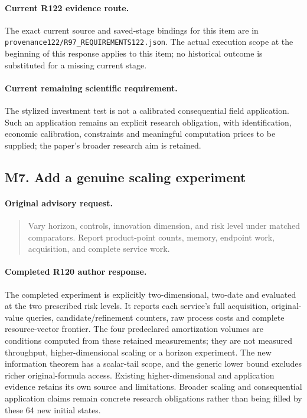 \paragraph{Current R122 evidence route.}
The exact current source and saved-stage bindings for this item are in \nolinkurl{provenance122/R97_REQUIREMENTS122.json}. The actual execution scope at the beginning of this response applies to this item; no historical outcome is substituted for a missing current stage.
\paragraph{Current remaining scientific requirement.}
The stylized investment test is not a calibrated consequential field application. Such an application remains an explicit research obligation, with identification, economic calibration, constraints and meaningful computation prices to be supplied; the paper's broader research aim is retained.

\subsection{M7. Add a genuine scaling experiment}
\label{response122:M7}

\paragraph{Original advisory request.}
\begin{quote}
Vary horizon, controls, innovation dimension, and risk level under matched comparators. Report product-point counts, memory, endpoint work, acquisition, and complete service work.
\end{quote}

\paragraph{Completed R120 author response.}
The completed experiment is explicitly two-dimensional, two-date and evaluated at the two prescribed risk levels. It reports each service's full acquisition, original-value queries, candidate/refinement counters, raw process costs and complete resource-vector frontier. The four predeclared amortization volumes are conditions computed from these retained measurements; they are not measured throughput, higher-dimensional scaling or a horizon experiment. The new information theorem has a scalar-tail scope, and the generic lower bound excludes richer original-formula access. Existing higher-dimensional and application evidence retains its own source and limitations. Broader scaling and consequential application claims remain concrete research obligations rather than being filled by these 64 new initial states.

